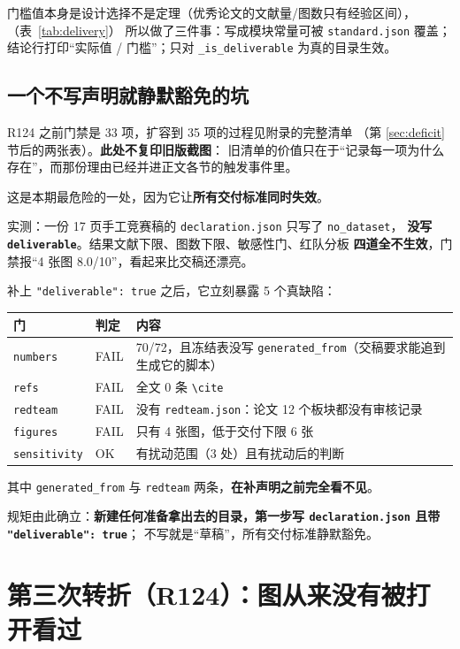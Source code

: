 \documentclass[11pt,a4paper]{article}
\newcommand{\code}[1]{\texttt{#1}}
\begin{document}
门槛值本身是设计选择不是定理（优秀论文的文献量/图数只有经验区间），（表~\ref{tab:delivery}）
所以做了三件事：写成模块常量可被 \code{standard.json} 覆盖；
结论行打印“实际值 / 门槛”；只对 \code{\_is\_deliverable} 为真的目录生效。

\subsection{一个不写声明就静默豁免的坑}

R124 之前门禁是 33 项，扩容到 35 项的过程见附录的完整清单
（第 \ref{sec:deficit} 节后的两张表）。\textbf{此处不复印旧版截图}：
旧清单的价值只在于“记录每一项为什么存在”，而那份理由已经并进正文各节的触发事件里。

这是本期最危险的一处，因为它让\textbf{所有交付标准同时失效}。

实测：一份 17 页手工竞赛稿的 \code{declaration.json} 只写了 \code{no\_dataset}，
\textbf{没写 \code{deliverable}}。结果文献下限、图数下限、敏感性门、红队分板
\textbf{四道全不生效}，门禁报“4 张图 8.0/10”，看起来比交稿还漂亮。

补上 \code{"deliverable": true} 之后，它立刻暴露 5 个真缺陷：

\begin{center}\small
\begin{tabular}{llp{8.4cm}}
\toprule
门 & 判定 & 内容\\
\midrule
\code{numbers} & FAIL & 70/72，且冻结表没写 \code{generated\_from}（交稿要求能追到生成它的脚本）\\
\code{refs} & FAIL & 全文 0 条 \code{\textbackslash cite}\\
\code{redteam} & FAIL & 没有 \code{redteam.json}：论文 12 个板块都没有审核记录\\
\code{figures} & FAIL & 只有 4 张图，低于交付下限 6 张\\
\code{sensitivity} & OK & 有扰动范围（3 处）且有扰动后的判断\\
\bottomrule
\end{tabular}
\end{center}

其中 \code{generated\_from} 与 \code{redteam} 两条，\textbf{在补声明之前完全看不见}。

规矩由此确立：\textbf{新建任何准备拿出去的目录，第一步写 \code{declaration.json} 且带 \code{"deliverable": true}}；
不写就是“草稿”，所有交付标准静默豁免。

\section{第三次转折（R124）：图从来没有被打开看过}\label{sec:r124}
\end{document}
